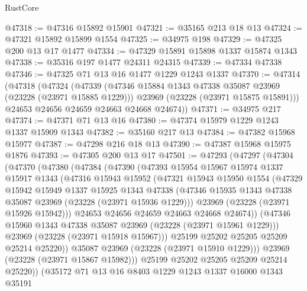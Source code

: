 \begin{lexlean}{RustCore}
\begin{coremodule}
@47318 := @47316 @15892 @15901
@47321 := @35165 @213 @18 @13
@47324 := @47321 @15892 @15899 @1554
@47325 := @34975 @198
@47329 := @47325 @200 @13 @17 @1477
@47334 := @47329 @15891 @15898 @1337 @15874 @1343
@47338 := @35316 @197 @1477 @24311 @24315
@47339 := @47334 @47338
@47346 := @47325 @71 @13 @16 @1477 @1229 @1243 @1337
@47370 := @47314
    (@47318
      (@47324
        (@47339
          (@47346 @15884 @1343 @47338 @35087 @23969 (@23228 (@23971 @15885 @1229)))
          @23969
          (@23228 (@23971 @15875 @15891)))
        @24653
        @24656
        @24659
        @24663
        @24668
        @24674))
@47371 := @34975 @217
@47374 := @47371 @71 @13 @16
@47380 := @47374 @15979 @1229 @1243 @1337 @15909 @1343
@47382 := @35160 @217 @13
@47384 := @47382 @15968 @15977
@47387 := @47298 @216 @18 @13
@47390 := @47387 @15968 @15975 @1876
@47393 := @47305 @200 @13 @17
@47501 := @47293
    (@47297
      (@47304
        (@47370
          (@47380
            (@47384
              (@47390
                (@47393
                  @15954
                  @15967
                  @15974
                  @1337
                  @15917
                  @1343
                  (@47316
                    @15943
                    @15952
                    (@47321
                      @15943
                      @15950
                      @1554
                      (@47329
                        @15942
                        @15949
                        @1337
                        @15925
                        @1343
                        @47338
                        (@47346 @15935 @1343 @47338 @35087 @23969 (@23228 (@23971 @15936 @1229)))
                        @23969
                        (@23228 (@23971 @15926 @15942)))
                      @24653
                      @24656
                      @24659
                      @24663
                      @24668
                      @24674))
                  (@47346 @15960 @1343 @47338 @35087 @23969 (@23228 (@23971 @15961 @1229)))
                  @23969
                  (@23228 (@23971 @15918 @15967)))
                @25199
                @25202
                @25205
                @25209
                @25214
                @25220))
            @35087
            @23969
            (@23228 (@23971 @15910 @1229)))
          @23969
          (@23228 (@23971 @15867 @15982)))
        @25199
        @25202
        @25205
        @25209
        @25214
        @25220))
    (@35172
      @71
      @13
      @16
      @8403
      @1229
      @1243
      @1337
      @16000
      @1343
      @35191

\end{coremodule}
\end{lexlean}
